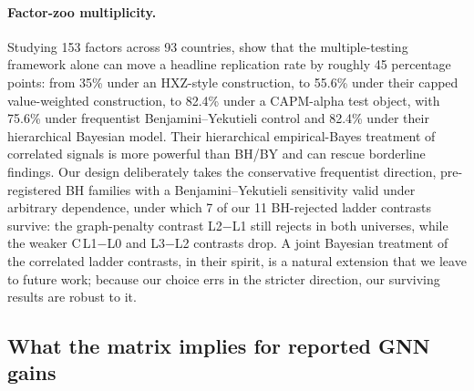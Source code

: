 \documentclass{article}
\begin{document}
\paragraph{Factor-zoo multiplicity.} Studying 153 factors across 93 countries, \citet{jkp2023jf} show that the multiple-testing framework alone can move a headline replication rate by roughly 45 percentage points: from 35\% under an HXZ-style construction, to 55.6\% under their capped value-weighted construction, to 82.4\% under a CAPM-alpha test object, with 75.6\% under frequentist Benjamini--Yekutieli control and 82.4\% under their hierarchical Bayesian model. Their hierarchical empirical-Bayes treatment of correlated signals is more powerful than BH/BY and can rescue borderline findings. Our design deliberately takes the conservative frequentist direction, pre-registered BH families with a Benjamini--Yekutieli sensitivity valid under arbitrary dependence, under which 7 of our 11 BH-rejected ladder contrasts survive: the graph-penalty contrast L2$-$L1 still rejects in both universes, while the weaker C\,L1$-$L0 and L3$-$L2 contrasts drop. A joint Bayesian treatment of the correlated ladder contrasts, in their spirit, is a natural extension that we leave to future work; because our choice errs in the stricter direction, our surviving results are robust to it.

\subsection{What the matrix implies for reported GNN gains}\label{app:lit:implications}
\end{document}
